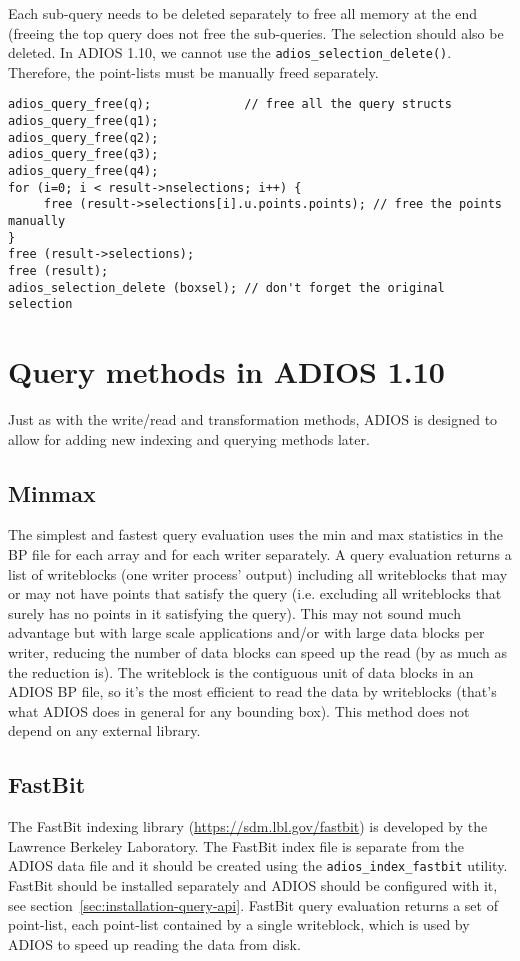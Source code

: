 Each sub-query needs to be deleted separately to free all memory at the end (freeing the top query does not free the sub-queries. The selection should also be deleted. In ADIOS 1.10, we cannot use the \linebreak \verb+adios_selection_delete()+. Therefore, the point-lists must be manually freed separately. 

\begin{lstlisting}[alsolanguage=C]
adios_query_free(q);             // free all the query structs
adios_query_free(q1);
adios_query_free(q2);
adios_query_free(q3);
adios_query_free(q4);
for (i=0; i < result->nselections; i++) {
     free (result->selections[i].u.points.points); // free the points manually
}
free (result->selections);
free (result);
adios_selection_delete (boxsel); // don't forget the original selection
\end{lstlisting}

%
%
\section{Query methods in ADIOS 1.10}

Just as with the write/read and transformation methods, ADIOS is designed to allow for adding new indexing and querying methods later. 

\subsection{Minmax}
The simplest and fastest query evaluation uses the min and max statistics in the BP file for each array and for each writer separately. A query evaluation returns a list of writeblocks (one writer process' output) including all writeblocks that may or may not have points that satisfy the query (i.e. excluding all writeblocks that surely has no points in it satisfying the query). This may not sound much advantage but with large scale applications and/or with large data blocks per writer, reducing the number of data blocks can speed up the read (by as much as the reduction is). The writeblock is the contiguous unit of data blocks in an ADIOS BP file, so it's the most efficient to read the data by writeblocks (that's what ADIOS does in general for any bounding box). This method does not depend on any external library. 

\subsection{FastBit}
The FastBit indexing library (\url{https://sdm.lbl.gov/fastbit}) is developed by the Lawrence Berkeley Laboratory. The FastBit index file is separate from the ADIOS data file and it should be created using the \verb+adios_index_fastbit+ utility. FastBit should be installed separately and ADIOS should be configured with it, see section~\ref{sec:installation-query-api}. FastBit query evaluation returns a set of point-list, each point-list contained by a single writeblock, which is used by ADIOS to speed up reading the data from disk. 

